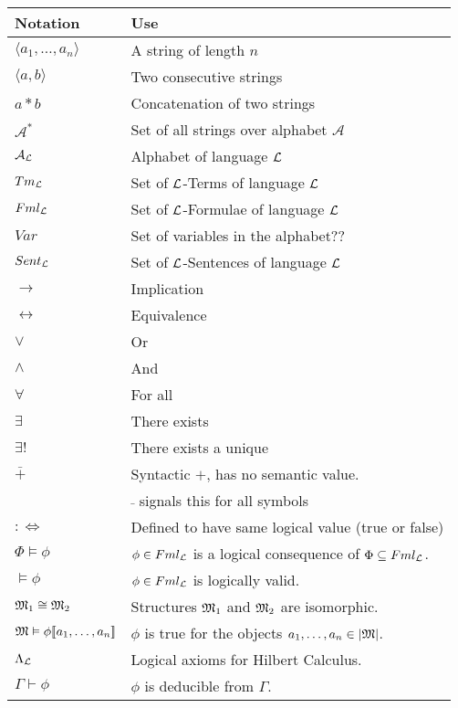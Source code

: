 \documentclass[11pt,a4paper]{article}
\begin{document}
\begin{center}\begin{tabular}{|l|l|}
\hline
\textbf{Notation}&\textbf{Use}\\
\hline$\langle a_1,\dots,a_n\rangle$&A string of length $n$\\
$\langle a,b\rangle$&Two consecutive strings\\
$a*b$&Concatenation of two strings\\
$\mathcal{A}^*$&Set of all strings over alphabet $\mathcal{A}$\\
$\mathcal{A}_{\mathcal{L}}$&Alphabet of language $\mathcal{L}$\\
$Tm_{\mathcal{L}}$&Set of $\mathcal{L}$-Terms of language $\mathcal{L}$\\
$Fml_{\mathcal{L}}$&Set of $\mathcal{L}$-Formulae of language $\mathcal{L}$\\
$Var$&Set of variables in the alphabet??\\
$Sent_{\mathcal{L}}$&Set of $\mathcal{L}$-Sentences of language $\mathcal{L}$\\
$\to$&Implication\\
$\leftrightarrow$&Equivalence\\
$\vee$& Or\\
$\wedge$&And\\
$\forall$&For all\\
$\exists$&There exists\\
$\exists!$&There exists a unique\\
$\bar+$&Syntactic $+$, has no semantic value.\\
&$\bar{ }$ signals this for all symbols\\
$:\Leftrightarrow$&Defined to have same logical value (true or false)\\
$\Phi\vDash\phi$&$\phi\in Fml_{\mathcal{L}}$ is a logical consequence of $\Phi\subseteq Fml_{\mathcal{L}}$.\\
$\vDash\phi$&$\phi\in Fml_{\mathcal{L}}$ is logically valid.\\
$\mathfrak{M}_1\cong\mathfrak{M}_2$&Structures $\mathfrak{M}_1$ and $\mathfrak{M}_2$ are isomorphic.\\
$\mathfrak{M}\vDash\phi[\![a_1,\dots,a_n]\!]$&$\phi$ is true for the objects $a_1,\dots,a_n\in|\mathfrak{M}|$.\\
$\Lambda_{\mathcal{L}}$&Logical axioms for Hilbert Calculus.\\
$\Gamma\vdash\phi$&$\phi$ is deducible from $\Gamma$.\\
\hline
\end{tabular}\end{center}
\end{document}
